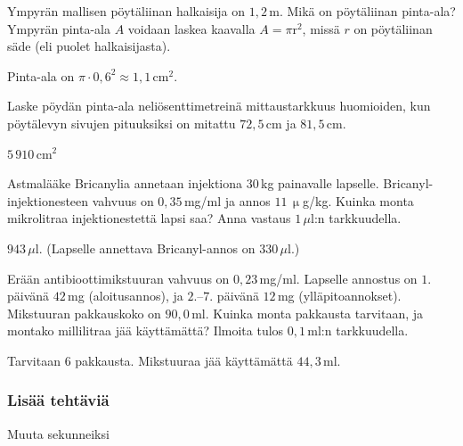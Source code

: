 \begin{tehtavasivu}
\begin{tehtava}
        Ympyrän mallisen pöytäliinan halkaisija on $1,2$\,m.  Mikä on pöytäliinan pinta-ala? Ympyrän pinta-ala $A$ voidaan laskea kaavalla $A=\pi\text{r}^2$, missä $r$ on pöytäliinan säde (eli puolet halkaisijasta).
        \begin{vastaus}
        Pinta-ala on $\pi \cdot 0,6^2 \approx 1,1\,$cm$^2$.
        \end{vastaus}
\end{tehtava}

\begin{tehtava}
Laske pöydän pinta-ala neliösenttimetreinä mittaustarkkuus huomioiden, kun pöytälevyn sivujen pituuksiksi on mitattu $72,5$\,cm ja $81,5$\,cm.
\begin{vastaus}
$5\,910$\,cm$^2$
\end{vastaus}
\end{tehtava}

\begin{tehtava}
Astmalääke Bricanylia annetaan injektiona $30$\,kg painavalle lapselle. Bricanyl-injektionesteen vahvuus on $0,35$\,mg/ml ja annos $11$\,$\upmu$g/kg. Kuinka monta mikrolitraa injektionestettä lapsi saa? Anna vastaus $1$\,$\mu$l:n tarkkuudella. %
 \begin{vastaus}
$943$\,$\mu$l. (Lapselle annettava Bricanyl-annos on $330$\,$\mu$l.) %
 \end{vastaus}
\end{tehtava}

\begin{tehtava}
Erään antibioottimikstuuran vahvuus on $0,23$\,mg/ml. Lapselle annostus on $1.$ päivänä $42$\,mg (aloitusannos), ja $2$.--$7$. päivänä $12$\,mg (ylläpitoannokset). Mikstuuran pakkauskoko on $90,0$\,ml. Kuinka monta pakkausta tarvitaan, ja montako millilitraa jää käyttämättä? Ilmoita tulos $0,1$\,ml:n tarkkuudella.
 \begin{vastaus}
Tarvitaan $6$ pakkausta. Mikstuuraa jää käyttämättä $44,3$\,ml.
 \end{vastaus}
\end{tehtava}

\subsubsection*{Lisää tehtäviä}

\begin{tehtava}
Muuta sekunneiksi
\begin{vastaus}
\end{vastaus}
\end{tehtava}


\end{tehtavasivu}
